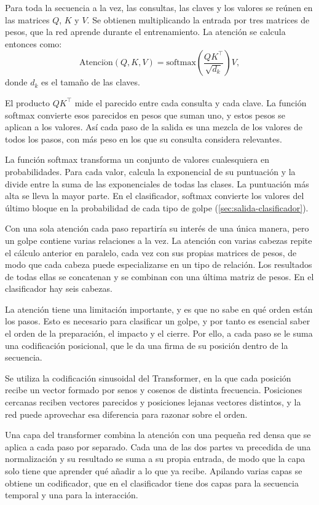Para toda la secuencia a la vez, las consultas, las claves y los valores se reúnen en las matrices $Q$, $K$ y $V$.
Se obtienen multiplicando la entrada por tres matrices de pesos, que la red aprende durante el entrenamiento.
La atención se calcula entonces como:
\begin{equation}
  \mathrm{Atenci\acute{o}n}(Q, K, V) = \mathrm{softmax}\left( \frac{Q K^{\top}}{\sqrt{d_k}} \right) V,
  \label{eq:atencion}
\end{equation}
donde $d_k$ es el tamaño de las claves.

El producto $Q K^{\top}$ mide el parecido entre cada consulta y cada clave.
La función softmax convierte esos parecidos en pesos que suman uno, y estos pesos se aplican a los valores.
Así cada paso de la salida es una mezcla de los valores de todos los pasos, con más peso en los que su consulta considera relevantes.

La función softmax transforma un conjunto de valores cualesquiera en probabilidades.
Para cada valor, calcula la exponencial de su puntuación y la divide entre la suma de las exponenciales de todas las clases.
La puntuación más alta se lleva la mayor parte.
En el clasificador, softmax convierte los valores del último bloque en la probabilidad de cada tipo de golpe (\cref{sec:salida-clasificador}).

Con una sola atención cada paso repartiría su interés de una única manera, pero un golpe contiene varias relaciones a la vez.
La atención con varias cabezas repite el cálculo anterior en paralelo, cada vez con sus propias matrices de pesos, de modo que cada cabeza puede especializarse en un tipo de relación.
Los resultados de todas ellas se concatenan y se combinan con una última matriz de pesos.
En el clasificador hay seis cabezas.

La atención tiene una limitación importante, y es que no sabe en qué orden están los pasos.
Esto es necesario para clasificar un golpe, y por tanto es esencial saber el orden de la preparación, el impacto y el cierre.
Por ello, a cada paso se le suma una codificación posicional, que le da una firma de su posición dentro de la secuencia.

Se utiliza la codificación sinusoidal del Transformer, en la que cada posición recibe un vector formado por senos y cosenos de distinta frecuencia.
Posiciones cercanas reciben vectores parecidos y posiciones lejanas vectores distintos, y la red puede aprovechar esa diferencia para razonar sobre el orden.

Una capa del transformer combina la atención con una pequeña red densa que se aplica a cada paso por separado.
Cada una de las dos partes va precedida de una normalización y su resultado se suma a su propia entrada, de modo que la capa solo tiene que aprender qué añadir a lo que ya recibe.
Apilando varias capas se obtiene un codificador, que en el clasificador tiene dos capas para la secuencia temporal y una para la interacción.

